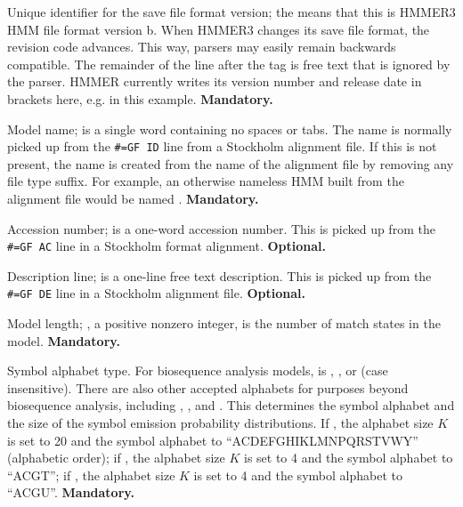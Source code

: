\begin{sreitems}{}

\item [\emprog{HMMER3/f}] Unique identifier for the save file format
  version; the  means that this is HMMER3 HMM file format
  version b. When HMMER3 changes its save file format, the revision
  code advances. This way, parsers may easily remain backwards
  compatible. The remainder of the line after the  tag
  is free text that is ignored by the parser. HMMER currently writes
  its version number and release date in brackets here,
  e.g. \prog{[3.0b2 | June 2009]} in this
  example. \textbf{Mandatory.}

\item [\emprog{NAME <s>}] Model name;  is a single word
containing no spaces or tabs. The name is normally picked up from the
\verb+#=GF ID+ line from a Stockholm alignment file.  If this is not
present, the name is created from the name of the alignment file by
removing any file type suffix. For example, an otherwise nameless HMM
built from the alignment file  would be named
.  \textbf{Mandatory.}

\item [\emprog{ACC <s>}] Accession number;  is a one-word
accession number. This is picked up from the \verb+#=GF AC+ line in a
Stockholm format alignment. \textbf{Optional.}

\item [\emprog{DESC <s>}] Description line;  is a one-line
free text description. This is picked up from the \verb+#=GF DE+ line
in a Stockholm alignment file. \textbf{Optional.}

\item [\emprog{LENG <d>}] Model length; , a positive nonzero
integer, is the number of match states in the model.
\textbf{Mandatory.}

\item [\emprog{ALPH <s>}] Symbol alphabet type. For biosequence
analysis models,  is , , or 
(case insensitive). There are also other accepted alphabets for
purposes beyond biosequence analysis, including ,
, and . This determines the symbol alphabet
and the size of the symbol emission probability distributions.  If
, the alphabet size $K$ is set to 20 and the symbol
alphabet to ``ACDEFGHIKLMNPQRSTVWY'' (alphabetic order); if
, the alphabet size $K$ is set to 4 and the symbol alphabet
to ``ACGT''; if , the alphabet size $K$ is set to 4 and the
symbol alphabet to ``ACGU''. \textbf{Mandatory.}


\end{sreitems}
